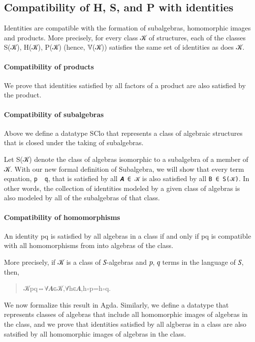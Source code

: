 \documentclass[a4paper,USenglish,cleveref,autoref,thm-restate]{lipics-v2019}
\begin{document}
\subsection{Compatibility of H, S, and P with identities}\label{sec:compatibility-of-identities}
Identities are compatible with the formation of subalgebras, homomorphic images and products. More precisely, for every class 𝒦 of structures, each of the classes S(𝒦), H(𝒦), P(𝒦) (hence, 𝕍(𝒦)) satisfies the same set of identities as does 𝒦.

\paragraph*{Compatibility of products}
We prove that identities satisfied by all factors of a product are also satisfied by the product.
\begin{code}\end{code}

\paragraph*{Compatibility of subalgebras}
Above we define a datatype SClo that represents a class of algebraic structures that is closed under the taking of subalgebras.

Let S(𝒦) denote the class of algebras isomorphic to a subalgebra of a member of 𝒦. With our new formal definition of Subalgebra, we will show that every term equation, \texttt{p\ \Aapprox \ q}, that is satisfied by all \texttt{𝑨\ ∈\ 𝒦} is also satisfied by all \texttt{B\ ∈\ S(𝒦)}. In other words, the collection of identities modeled by a given class of algebras is also modeled by all of the subalgebras of that class.
\begin{code}\end{code}

\paragraph*{Compatibility of homomorphisms}
An identity \AB p\AS \Aapprox\AS\AB q is satisfied by all algebras in a class if and only if \AB p\AS \Aapprox\AS\AB q is compatible with all homomorphisms from \TX into algebras of the class.

More precisely, if \AB 𝒦 is a class of \AB 𝑆-algebras and \AB 𝑝, \AB 𝑞 terms in the language of \AB 𝑆, then,
\begin{quote}
\AB 𝒦\AS\Amodels\AS\AB p\AS\Aapprox\AS\AB  q\AS\AS ⇔\AS\AS\ASy ∀\AS\AB 𝑨\AS\ASy ∈\AS\AB 𝒦\AS\ASy ,\AS\ASy ∀\AS\AB h\AS\ASy ∈\AS{}\AS\TX\AS \AB 𝑨\AS\ASy ,\AB h\AS\ASy ∘\AS\termTX p\AS\ASy =\AS\AB h\AS\ASy ∘\AS\termTX q.
\end{quote}
We now formalize this result in Agda. Similarly, we define a datatype that represents classes of algebras that include all homomorphic images of algebras in the class, and we prove that identities satisfied by all algberas in a class are also satsified by all homomorphic images of algebras in the class.
\begin{code}\end{code}
\end{document}
